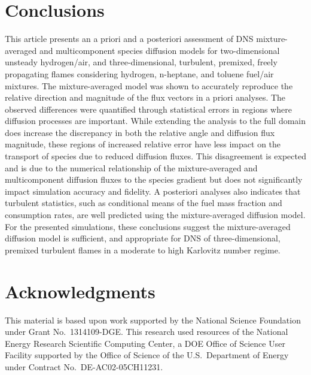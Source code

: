 \documentclass[preprint,review,12pt]{elsarticle}
\begin{document}
\section{Conclusions}\label{sec:conclusions}
This article presents an a priori and a posteriori assessment of DNS mixture-averaged and multicomponent species diffusion models for two-dimensional unsteady hydrogen/air, and three-dimensional, turbulent, premixed, freely propagating flames considering hydrogen, n-heptane, and toluene fuel/air mixtures.
The mixture-averaged model was shown to accurately reproduce the relative direction and magnitude of the flux vectors in a priori analyses.  
The observed differences were quantified through statistical errors in regions where diffusion processes are important.  
While extending the analysis to the full domain does increase the discrepancy in both the relative angle and diffusion flux magnitude, these regions of increased relative error have less impact on the transport of species due to reduced diffusion fluxes.
This disagreement is expected and is due to the numerical relationship of the mixture-averaged and multicomponent diffusion fluxes to the species gradient but does not significantly impact simulation accuracy and fidelity.
A posteriori analyses also indicates that turbulent statistics, such as conditional means of the fuel mass fraction and consumption rates, are well predicted using the mixture-averaged diffusion model.
For the presented simulations, these conclusions suggest the mixture-averaged diffusion model is sufficient, and appropriate for DNS of three-dimensional, premixed turbulent flames in a moderate to high Karlovitz number regime.

\section*{Acknowledgments}
\label{Acknowledgments}
This material is based upon work supported by the National Science Foundation under Grant No.\ 1314109-DGE.
This research used resources of the National Energy Research Scientific Computing Center, a DOE Office of Science User Facility supported by the Office of Science of the U.S.\ Department of Energy under Contract No.\ DE-AC02-05CH11231.
\end{document}
